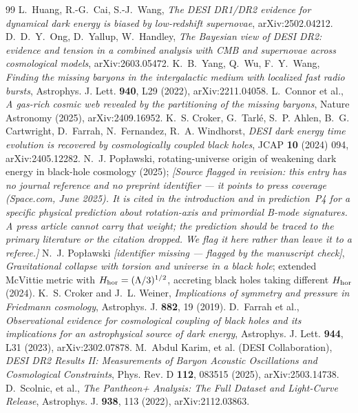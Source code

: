 \documentclass[11pt]{article}
\begin{document}
\begin{thebibliography}{99}
 L.~Huang, R.-G.~Cai, S.-J.~Wang, \emph{The DESI DR1/DR2 evidence for dynamical dark energy is biased by low-redshift supernovae}, arXiv:2502.04212.
 D.~D.~Y.~Ong, D.~Yallup, W.~Handley, \emph{The Bayesian view of DESI DR2: evidence and tension in a combined analysis with CMB and supernovae across cosmological models}, arXiv:2603.05472.
 K.~B.~Yang, Q.~Wu, F.~Y.~Wang, \emph{Finding the missing baryons in the intergalactic medium with localized fast radio bursts}, Astrophys. J. Lett. \textbf{940}, L29 (2022), arXiv:2211.04058.
 L.~Connor et al., \emph{A gas-rich cosmic web revealed by the partitioning of the missing baryons}, Nature Astronomy (2025), arXiv:2409.16952.
 K.~S. Croker, G.~Tarl\'e, S.~P. Ahlen, B.~G. Cartwright, D.~Farrah, N.~Fernandez, R.~A. Windhorst, \emph{DESI dark energy time evolution is recovered by cosmologically coupled black holes}, JCAP \textbf{10} (2024) 094, arXiv:2405.12282.
 N.~J. Pop{\l}awski, rotating-universe origin of weakening dark energy in black-hole cosmology (2025); \emph{[Source flagged in revision: this entry has no journal reference and no preprint identifier --- it points to press coverage (Space.com, June 2025). It is cited in the introduction and in prediction~P4 for a specific physical prediction about rotation-axis and primordial B-mode signatures. A press article cannot carry that weight; the prediction should be traced to the primary literature or the citation dropped. We flag it here rather than leave it to a referee.]}
 N.~J. Pop{\l}awski \emph{[identifier missing --- flagged by the manuscript check]}, \emph{Gravitational collapse with torsion and universe in a black hole}; extended McVittie metric with $H_{\rm hor} = (\Lambda/3)^{1/2}$, accreting black holes taking different $H_{\rm hor}$ (2024).
 K.~S. Croker and J.~L. Weiner, \emph{Implications of symmetry and pressure in Friedmann cosmology}, Astrophys. J. \textbf{882}, 19 (2019).
 D.~Farrah et al., \emph{Observational evidence for cosmological coupling of black holes and its implications for an astrophysical source of dark energy}, Astrophys. J. Lett. \textbf{944}, L31 (2023), arXiv:2302.07878.
 M.~Abdul Karim, et al. (DESI Collaboration), \emph{DESI DR2 Results II: Measurements of Baryon Acoustic Oscillations and Cosmological Constraints}, Phys. Rev. D \textbf{112}, 083515 (2025), arXiv:2503.14738.
 D.~Scolnic, et al., \emph{The Pantheon+ Analysis: The Full Dataset and Light-Curve Release}, Astrophys. J. \textbf{938}, 113 (2022), arXiv:2112.03863.

\end{thebibliography}
\end{document}
